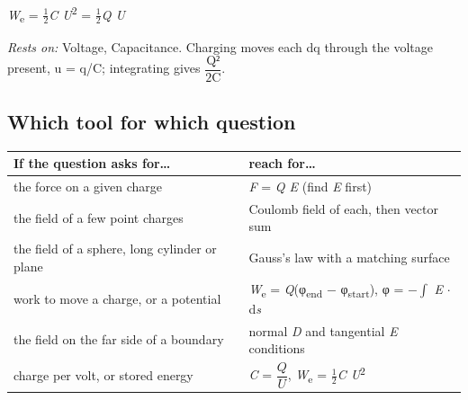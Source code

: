 \documentclass[11pt]{article}
\begin{document}
\begin{keepsection}
\begin{itemize}
\textit{W}\textsubscript{e} = \ensuremath{\tfrac12}\textit{C U}\textsuperscript{2} = \ensuremath{\tfrac12}\textit{Q U}

\emph{Rests on:} Voltage, Capacitance. Charging moves each dq through the voltage present, u = q/C; integrating gives {\small\ensuremath{\dfrac{\mathrm{Q}²}{2\mathrm{C}}}}.
\end{itemize}

\begin{keepsection}
\subsection{Which tool for which question}

\begin{center}\small\begin{tabularx}{\linewidth}{>{\raggedright\arraybackslash}X>{\raggedright\arraybackslash}X}\toprule
\textbf{If the question asks for…} & \textbf{reach for…} \\ \midrule
the force on a given charge & \textit{F} = \textit{Q E} (find \textit{E} first) \\
the field of a few point charges & Coulomb field of each, then vector sum \\
the field of a sphere, long cylinder or plane & Gauss’s law with a matching surface \\
work to move a charge, or a potential & \textit{W}\textsubscript{e} = \textit{Q}(φ\textsubscript{end} \ensuremath{-} φ\textsubscript{start}), φ = \ensuremath{-}$\int $ \textit{E} \ensuremath{\cdot} d\textit{s} \\
the field on the far side of a boundary & normal \textit{D} and tangential \textit{E} conditions \\
charge per volt, or stored energy & \textit{C} = {\small\ensuremath{\dfrac{{Q}}{{U}}}}, \textit{W}\textsubscript{e} = \ensuremath{\tfrac12}\textit{C U}\textsuperscript{2} \\
\bottomrule\end{tabularx}\end{center}
\end{keepsection}
\end{keepsection}
\end{document}
